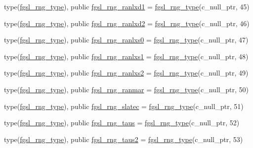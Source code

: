 \begin{DoxyCompactItemize}
\item 
type(\hyperlink{structfgsl_1_1fgsl__rng__type}{fgsl\+\_\+rng\+\_\+type}), public \hyperlink{namespacefgsl_a524c5eebeb98cf095b5bfe9bde105de5}{fgsl\+\_\+rng\+\_\+ranlxd1} = \hyperlink{structfgsl_1_1fgsl__rng__type}{fgsl\+\_\+rng\+\_\+type}(c\+\_\+null\+\_\+ptr, 45)
\item 
type(\hyperlink{structfgsl_1_1fgsl__rng__type}{fgsl\+\_\+rng\+\_\+type}), public \hyperlink{namespacefgsl_ab9c54c86c74196b01b8038402c43038a}{fgsl\+\_\+rng\+\_\+ranlxd2} = \hyperlink{structfgsl_1_1fgsl__rng__type}{fgsl\+\_\+rng\+\_\+type}(c\+\_\+null\+\_\+ptr, 46)
\item 
type(\hyperlink{structfgsl_1_1fgsl__rng__type}{fgsl\+\_\+rng\+\_\+type}), public \hyperlink{namespacefgsl_a7114194063748411f9f00507745269fa}{fgsl\+\_\+rng\+\_\+ranlxs0} = \hyperlink{structfgsl_1_1fgsl__rng__type}{fgsl\+\_\+rng\+\_\+type}(c\+\_\+null\+\_\+ptr, 47)
\item 
type(\hyperlink{structfgsl_1_1fgsl__rng__type}{fgsl\+\_\+rng\+\_\+type}), public \hyperlink{namespacefgsl_aa3756069479859f5b94693230b23f052}{fgsl\+\_\+rng\+\_\+ranlxs1} = \hyperlink{structfgsl_1_1fgsl__rng__type}{fgsl\+\_\+rng\+\_\+type}(c\+\_\+null\+\_\+ptr, 48)
\item 
type(\hyperlink{structfgsl_1_1fgsl__rng__type}{fgsl\+\_\+rng\+\_\+type}), public \hyperlink{namespacefgsl_a961029daf705e420d4626038ceffbdc5}{fgsl\+\_\+rng\+\_\+ranlxs2} = \hyperlink{structfgsl_1_1fgsl__rng__type}{fgsl\+\_\+rng\+\_\+type}(c\+\_\+null\+\_\+ptr, 49)
\item 
type(\hyperlink{structfgsl_1_1fgsl__rng__type}{fgsl\+\_\+rng\+\_\+type}), public \hyperlink{namespacefgsl_a099ffd8b436045a9bd570027a1406df4}{fgsl\+\_\+rng\+\_\+ranmar} = \hyperlink{structfgsl_1_1fgsl__rng__type}{fgsl\+\_\+rng\+\_\+type}(c\+\_\+null\+\_\+ptr, 50)
\item 
type(\hyperlink{structfgsl_1_1fgsl__rng__type}{fgsl\+\_\+rng\+\_\+type}), public \hyperlink{namespacefgsl_aa8d0035b0617f463167b9fce7aeedd26}{fgsl\+\_\+rng\+\_\+slatec} = \hyperlink{structfgsl_1_1fgsl__rng__type}{fgsl\+\_\+rng\+\_\+type}(c\+\_\+null\+\_\+ptr, 51)
\item 
type(\hyperlink{structfgsl_1_1fgsl__rng__type}{fgsl\+\_\+rng\+\_\+type}), public \hyperlink{namespacefgsl_a9fe9a6cae0f833d90b9c22d644165758}{fgsl\+\_\+rng\+\_\+taus} = \hyperlink{structfgsl_1_1fgsl__rng__type}{fgsl\+\_\+rng\+\_\+type}(c\+\_\+null\+\_\+ptr, 52)
\item 
type(\hyperlink{structfgsl_1_1fgsl__rng__type}{fgsl\+\_\+rng\+\_\+type}), public \hyperlink{namespacefgsl_a49b9837652787069b7179152078a6c9d}{fgsl\+\_\+rng\+\_\+taus2} = \hyperlink{structfgsl_1_1fgsl__rng__type}{fgsl\+\_\+rng\+\_\+type}(c\+\_\+null\+\_\+ptr, 53)

\end{DoxyCompactItemize}
